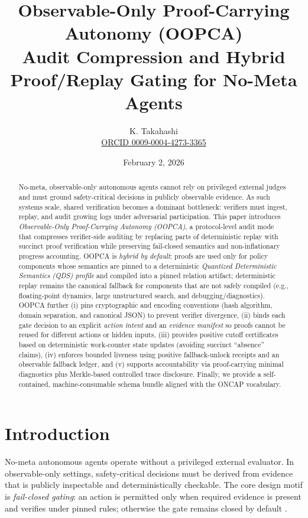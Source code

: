 \documentclass[11pt]{article}
\title{Observable-Only Proof-Carrying Autonomy (OOPCA)\\[0.5em]
\large Audit Compression and Hybrid Proof/Replay Gating for No-Meta Agents}
\author{K. Takahashi\\\small\href{https://orcid.org/0009-0004-4273-3365}{ORCID 0009-0004-4273-3365}}
\date{February 2, 2026}
\begin{document}
\maketitle

\begin{abstract}
No-meta, observable-only autonomous agents cannot rely on privileged external judges and must ground safety-critical decisions in publicly observable evidence. As such systems scale, shared verification becomes a dominant bottleneck: verifiers must ingest, replay, and audit growing logs under adversarial participation.
This paper introduces \emph{Observable-Only Proof-Carrying Autonomy (OOPCA)}, a protocol-level audit mode that compresses verifier-side auditing by replacing parts of deterministic replay with succinct proof verification while preserving fail-closed semantics and non-inflationary progress accounting.
OOPCA is \emph{hybrid by default}: proofs are used only for policy components whose semantics are pinned to a deterministic \emph{Quantized Deterministic Semantics (QDS) profile} and compiled into a pinned relation artifact; deterministic replay remains the canonical fallback for components that are not safely compiled (e.g., floating-point dynamics, large unstructured search, and debugging/diagnostics).
OOPCA further (i) pins cryptographic and encoding conventions (hash algorithm, domain separation, and canonical JSON) to prevent verifier divergence, (ii) binds each gate decision to an explicit \emph{action intent} and an \emph{evidence manifest} so proofs cannot be reused for different actions or hidden inputs, (iii) provides positive cutoff certificates based on deterministic work-counter state updates (avoiding succinct ``absence'' claims), (iv) enforces bounded liveness using positive fallback-unlock receipts and an observable fallback ledger, and (v) supports accountability via proof-carrying minimal diagnostics plus Merkle-based controlled trace disclosure.
Finally, we provide a self-contained, machine-consumable schema bundle aligned with the ONCAP vocabulary.
\end{abstract}

\section{Introduction}

No-meta autonomous agents operate without a privileged external evaluator. In observable-only settings, safety-critical decisions must be derived from evidence that is publicly inspectable and deterministically checkable. The core design motif is \emph{fail-closed gating}: an action is permitted only when required evidence is present and verifies under pinned rules; otherwise the gate remains closed by default \cite{Takahashi2026ONCAP}.
\end{document}
